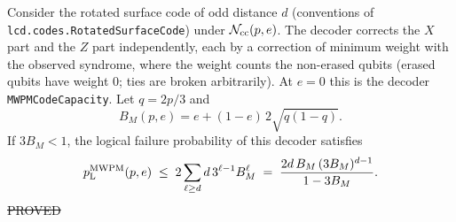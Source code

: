 \begin{theorem}\label{thm:mwpm-peierls}
Consider the rotated surface code of odd distance $d$ (conventions of \texttt{lcd.codes.RotatedSurfaceCode}) under $\mathcal{N}_{\rm cc}(p,e)$. The decoder corrects the $X$ part and the $Z$ part independently, each by a correction of minimum weight with the observed syndrome, where the weight counts the non-erased qubits (erased qubits have weight $0$; ties are broken arbitrarily). At $e=0$ this is the decoder \texttt{MWPMCodeCapacity}. Let $q=2p/3$ and
\[
B_M(p,e)=e+(1-e)\,2\sqrt{q(1-q)}.
\]
If $3B_M<1$, the logical failure probability of this decoder satisfies
\[
p_{\mathrm{L}}^{\rm MWPM}(p,e)\;\le\;2\sum_{\ell\ge d}d\,3^{\ell-1}B_M^{\ell}\;=\;\frac{2d\,B_M\,(3B_M)^{d-1}}{1-3B_M}.
\]
\hfill\st{PROVED}
\end{theorem}
